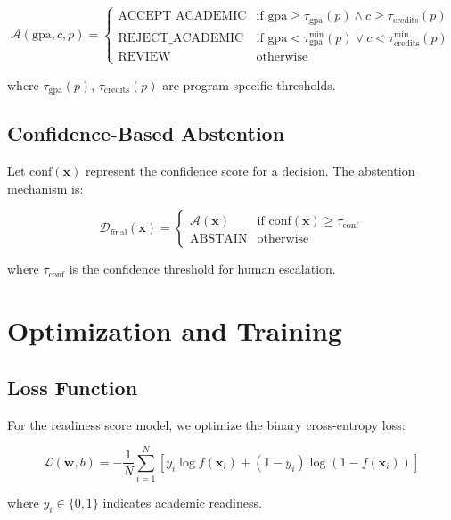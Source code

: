 \documentclass[11pt]{article}
\begin{document}
\begin{equation}
\mathcal{A}(\text{gpa}, c, p) = \begin{cases}
\text{ACCEPT\_ACADEMIC} & \text{if } \text{gpa} \geq \tau_{\text{gpa}}(p) \land c \geq \tau_{\text{credits}}(p) \\
\text{REJECT\_ACADEMIC} & \text{if } \text{gpa} < \tau_{\text{gpa}}^{\text{min}}(p) \lor c < \tau_{\text{credits}}^{\text{min}}(p) \\
\text{REVIEW} & \text{otherwise}
\end{cases}
\end{equation}

where $\tau_{\text{gpa}}(p)$, $\tau_{\text{credits}}(p)$ are program-specific thresholds.

\subsection{Confidence-Based Abstention}
Let $\text{conf}(\mathbf{x})$ represent the confidence score for a decision. The abstention mechanism is:

\begin{equation}
\mathcal{D}_{\text{final}}(\mathbf{x}) = \begin{cases}
\mathcal{A}(\mathbf{x}) & \text{if } \text{conf}(\mathbf{x}) \geq \tau_{\text{conf}} \\
\text{ABSTAIN} & \text{otherwise}
\end{cases}
\end{equation}

where $\tau_{\text{conf}}$ is the confidence threshold for human escalation.

\section{Optimization and Training}

\subsection{Loss Function}
For the readiness score model, we optimize the binary cross-entropy loss:

\begin{equation}
\mathcal{L}(\mathbf{w}, b) = -\frac{1}{N} \sum_{i=1}^{N} \left[ y_i \log f(\mathbf{x}_i) + (1-y_i) \log(1-f(\mathbf{x}_i)) \right]
\end{equation}

where $y_i \in \{0, 1\}$ indicates academic readiness.
\end{document}
